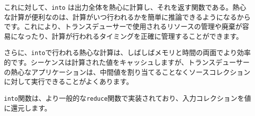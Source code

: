 これに対して、\texttt{into} は出力全体を熱心に計算し、それを返す関数である。熱心な計算が便利なのは、計算がいつ行われるかを簡単に推論できるようになるからです。これにより、トランスデューサーで使用されるリソースの管理や廃棄が容易になったり、計算が行われるタイミングを正確に管理することができます。

さらに、\texttt{into}で行われる熱心な計算は、しばしばメモリと時間の両面でより効率的です。シーケンスは計算された値をキャッシュしますが、トランスデューサーの熱心なアプリケーションは、中間値を割り当てることなくソースコレクションに対して実行できることがよくあります。

\texttt{into}関数は、より一般的な\texttt{reduce}関数で実装されており、入力コレクションを値に還元します。




